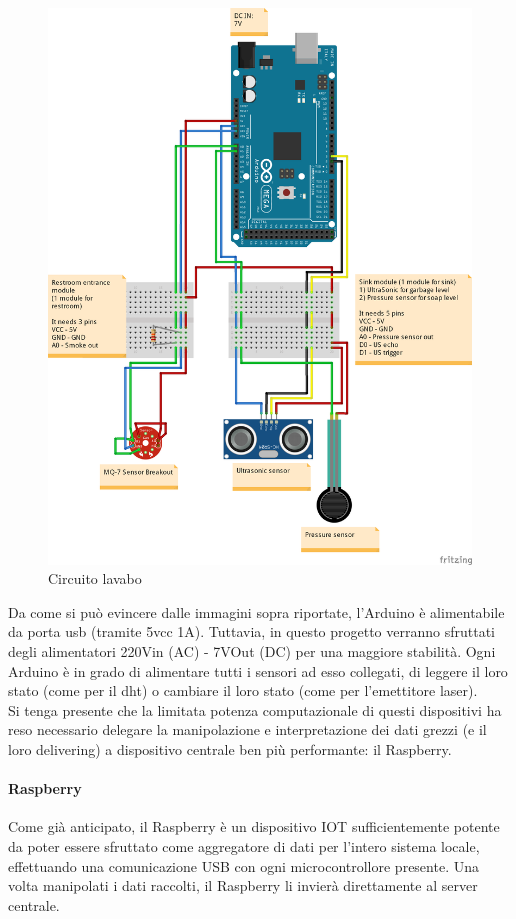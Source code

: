 \documentclass[12pt]{article}
\begin{document}
 \phantom{}
 \begin{figure}[H]

\centering
	\includegraphics[scale=0.40]{img/RestroomEntry_bb.png}  
    \caption{Circuito lavabo}
\end{figure}
Da come si può evincere dalle immagini sopra riportate, l'Arduino è alimentabile da porta usb (tramite 5vcc 1A). Tuttavia, in questo progetto verranno sfruttati degli alimentatori 220Vin (AC) - 7VOut (DC) per una maggiore stabilità.
Ogni Arduino è in grado di alimentare tutti i sensori ad esso collegati, di leggere il loro stato (come per il dht) o cambiare il loro stato (come per l'emettitore laser).\\
Si tenga presente che la limitata potenza computazionale di questi dispositivi ha reso necessario delegare la manipolazione e interpretazione dei dati grezzi (e il loro delivering) a dispositivo centrale ben più performante: il Raspberry.
\newpage
\paragraph{Raspberry}
Come già anticipato, il Raspberry è un dispositivo IOT sufficientemente potente da poter essere sfruttato come aggregatore di dati per l'intero sistema locale, effettuando una comunicazione USB con ogni microcontrollore presente.
Una volta manipolati i dati raccolti, il Raspberry li invierà direttamente al server centrale.
\end{document}
